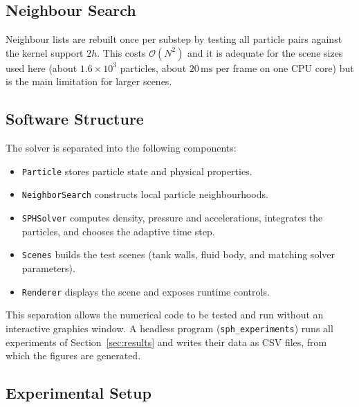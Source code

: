 \subsection{Neighbour Search}

Neighbour lists are rebuilt once per substep by testing all particle pairs
against the kernel support $2h$. This costs $\mathcal{O}(N^2)$ and it is adequate for
the scene sizes used here (about $1.6\times10^3$ particles, about
$20\,\mathrm{ms}$ per frame on one CPU core) but is the main
limitation for larger scenes.

\subsection{Software Structure}

The solver is separated into the following components:
\begin{itemize}
    \item \texttt{Particle} stores particle state and physical properties.
    \item \texttt{NeighborSearch} constructs local particle neighbourhoods.
    \item \texttt{SPHSolver} computes density, pressure and accelerations,
          integrates the particles, and chooses the adaptive time step.
    \item \texttt{Scenes} builds the test scenes (tank walls, fluid body, and
          matching solver parameters).
    \item \texttt{Renderer} displays the scene and exposes runtime controls.
\end{itemize}

This separation allows the numerical code to be tested and run without an
interactive graphics window. A headless program (\texttt{sph\_experiments})
runs all experiments of Section~\ref{sec:results} and writes their data as CSV
files, from which the figures are generated.

\newpage
\subsection{Experimental Setup}

